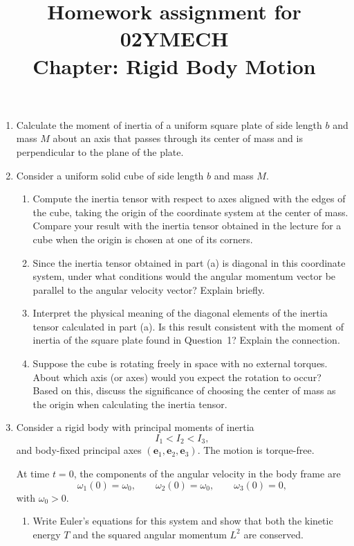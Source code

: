 \documentclass[12pt]{article}
\title{Homework assignment for 02YMECH \\ Chapter: Rigid Body Motion}
\begin{document}
\date{}
\maketitle
\vspace{-0.8in}
\begin{enumerate}
    \item Calculate the moment of inertia of a uniform square plate of side length $b$ and mass $M$ about an axis that passes through its center of mass and is perpendicular to the plane of the plate.

    \item Consider a uniform solid cube of side length $b$ and mass $M$.
    \begin{enumerate}
        \item Compute the inertia tensor with respect to axes aligned with the edges of the cube, taking the origin of the coordinate system at the center of mass. Compare your result with the inertia tensor obtained in the lecture for a cube when the origin is chosen at one of its corners.
        \item Since the inertia tensor obtained in part (a) is diagonal in this coordinate system, under what conditions would the angular momentum vector be parallel to the angular velocity vector? Explain briefly.
        \item Interpret the physical meaning of the diagonal elements of the inertia tensor calculated in part (a). Is this result consistent with the moment of inertia of the square plate found in Question~1? Explain the connection.
        \item Suppose the cube is rotating freely in space with no external torques. About which axis (or axes) would you expect the rotation to occur? Based on this, discuss the significance of choosing the center of mass as the origin when calculating the inertia tensor.
    \end{enumerate}

    \item Consider a rigid body with principal moments of inertia
\[
I_1<I_2<I_3,
\]
and body-fixed principal axes
\((\mathbf e_1,\mathbf e_2,\mathbf e_3)\).
The motion is torque-free.

At time \(t=0\), the components of the angular velocity in the body frame
are
\[
\omega_1(0)=\omega_0,
\qquad
\omega_2(0)=\omega_0,
\qquad
\omega_3(0)=0,
\]
with \(\omega_0>0\).

\begin{enumerate}
  \item[(a)] Write Euler’s equations for this system and show that both the
        kinetic energy \(T\) and the squared angular momentum \(L^2\) are
        conserved.


\end{enumerate}
\end{enumerate}
\end{document}
